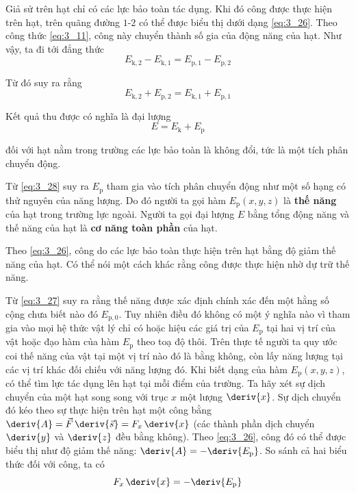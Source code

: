 Giả sử trên hạt chỉ có các lực bảo toàn tác dụng. Khi đó công được thực hiện trên hạt, trên quãng đường $1$-$2$ có thể được biểu thị dưới dạng \eqref{eq:3_26}. Theo công thức \eqref{eq:3_11}, công này chuyển thành số gia của động năng của hạt. Như vậy, ta đi tới đẳng thức
\begin{equation*}
E_{\text{k},2} - E_{\text{k},1} = E_{\text{p},1} - E_{\text{p},2}
\end{equation*}

\noindent
Từ đó suy ra rằng
\begin{equation*}
E_{\text{k},2} + E_{\text{p},2} = E_{\text{k},1} + E_{\text{p},1}
\end{equation*}

\noindent
Kết quả thu được có nghĩa là đại lượng 
\begin{equation}\label{eq:3_28}
E = E_{\text{k}} + E_{\text{p}}
\end{equation}

\noindent
đối với hạt nằm trong trường các lực bảo toàn là không đổi, tức là một tích phân chuyển động.

Từ \eqref{eq:3_28} suy ra $E_{\text{p}}$ tham gia vào tích phân chuyển động như một số hạng có thử nguyên của năng lượng. Do đó người ta gọi hàm $E_{\text{p}}(x,y,z)$ là  \textbf{thế năng} của hạt trong trường lực ngoài. Người ta gọi đại lượng  $E$ bằng tổng động năng và thế năng của hạt là \textbf{cơ năng toàn phần} của hạt.

Theo \eqref{eq:3_26}, công do các lực bảo toàn thực hiện trên hạt bằng độ giảm thế năng của hạt. Có thể nói một cách khác rằng công được thực hiện nhờ dự trữ thế năng.  

Từ \eqref{eq:3_27} suy ra rằng thế năng được xác định chính xác đến một hằng số cộng chưa biết nào đó $E_{\text{p},0}$. Tuy nhiên điều đó không có một ý nghĩa nào vì tham gia vào mọi hệ thức vật lý chỉ có hoặc hiệu các giá trị của $E_{\text{p}}$ tại hai vị trí của vật hoặc đạo hàm của hàm $E_{\text{p}}$ theo toạ độ thôi. Trên thực tế người ta quy ước coi thế năng của vật tại một vị trí nào đó là bằng không, còn lấy năng lượng tại các vị trí khác đối chiếu với năng lượng đó. 
Khi biết dạng của hàm $E_{\text{p}}(x,y,z)$, có thể tìm lực tác dụng lên hạt tại mỗi điểm của trường. Ta hãy xét sự dịch chuyển của một hạt song song với trục $x$ một lượng $\deriv{x}$. Sự dịch chuyển đó kéo theo sự thực hiện trên hạt một công bằng $\deriv{A}=\vec{F}\,\deriv{\vec{s}}=F_x\,\deriv{x}$ (các thành phần dịch chuyển $\deriv{y}$ và $\deriv{z}$ đều bằng không). Theo \eqref{eq:3_26}, công đó có thể được biểu thị như độ giảm thế năng: $\deriv{A}=-\deriv{E_{\text{p}}}$. So sánh cả hai biểu thức đối với công, ta có
\begin{equation*}
F_x\,\deriv{x} = -\deriv{E_{\text{p}}}
\end{equation*}

